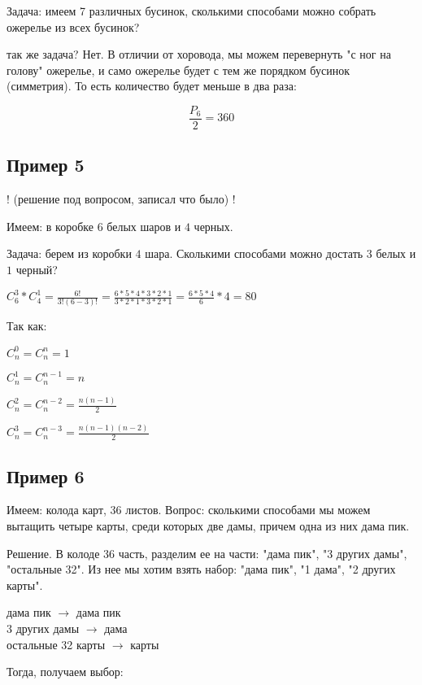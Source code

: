 \documentclass{article}
\begin{document}
Задача: имеем 7 различных бусинок, сколькими способами можно собрать ожерелье из всех бусинок?

так же задача? Нет. В отличии от хоровода, мы можем перевернуть "с ног на голову" ожерелье, и само ожерелье будет с тем же порядком бусинок (симметрия). То есть количество будет меньше в два раза:

$$\frac{P_6}{2} = 360$$

\subsection{Пример 5}

! (решение под вопросом, записал что было) !

Имеем: в коробке $6$ белых шаров и $4$ черных.

Задача: берем из коробки $4$ шара. Сколькими способами можно достать $3$ белых и $1$ черный?

$C_6^3 * C_4^1 = \frac{6!}{3!(6 - 3)!} = \frac{6 * 5 * 4 * 3 * 2 * 1}{3 * 2 * 1 * 3 * 2 * 1} = \frac{6 * 5 * 4}{6} * 4 = 80$

Так как:

$C_n^0 = C_n^n = 1$

$C_n^1 = C_n^{n - 1} = n $

$C_n^2 = C_n^{n - 2} = \frac{n(n - 1)}{2} $

$C_n^3 = C_n^{n - 3} = \frac{n(n - 1)(n - 2)}{2} $


\subsection{Пример 6}

Имеем: колода карт, 36 листов.
Вопрос: сколькими способами мы можем вытащить четыре карты, среди которых две дамы, причем одна из них дама пик.

Решение. В колоде 36 часть, разделим ее на части: "дама пик", "3 других дамы", "остальные 32". Из нее мы хотим взять набор: "дама пик", "1 дама", "2 других карты".

\begin{tabbing}
дама пик             \quad\qquad\qquad\qquad $\rightarrow$ \qquad дама пик \\
3 других дамы        \qquad\qquad $\rightarrow$  дама \\
остальные 32 карты   \qquad $\rightarrow$  карты \\
\end{tabbing}

Тогда, получаем выбор:
\end{document}
